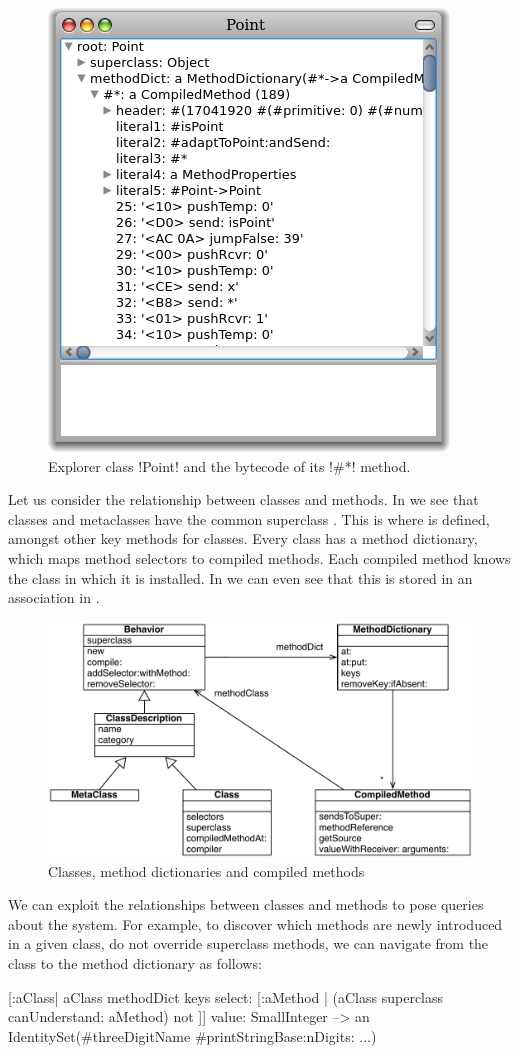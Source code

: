 \documentclass[a4paper,10pt,twoside]{book}
\begin{document}
\begin{figure}[ht]\centering
	\includegraphics[width=.5\linewidth]{CompiledMethod}
	\caption{Explorer class \ct!Point! and the bytecode of its \ct!\#*! method.}
\end{figure}

Let us consider the relationship between classes and methods.
In  we see that classes and metaclasses have the common superclass . This is where  is defined, amongst other key methods for classes.
Every class has a method dictionary, which maps method selectors to compiled methods.
Each compiled method knows the class in which it is installed.
In  we can even see that this is stored in an association in .

\begin{figure}[ht]\centering
	\includegraphics[width=0.8\linewidth]{MethodsAsObjects}
	\caption{Classes, method dictionaries and compiled methods}
\end{figure}

We can exploit the relationships between classes and methods to pose queries about the system.
For example, to discover which methods are newly introduced in a given class, \ie do not override superclass methods, we can navigate from the class to the method dictionary as follows:
\begin{code}{}
[:aClass| aClass methodDict keys select: [:aMethod |
  (aClass superclass canUnderstand: aMethod) not ]] value: SmallInteger
  --> an IdentitySet(#threeDigitName #printStringBase:nDigits: ...)
\end{code}
\end{document}
